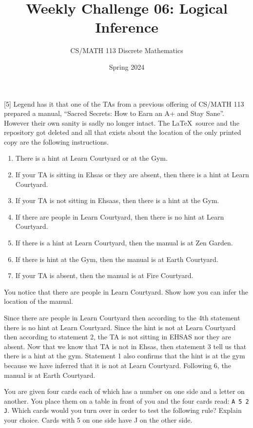 \documentclass[a4paper]{exam}
\title{Weekly Challenge 06: Logical Inference}
\author{CS/MATH 113 Discrete Mathematics}
\date{Spring 2024}
\begin{document}
\maketitle

\begin{questions}

  [5] Legend has it that one of the TAs from a previous offering of CS/MATH 113 prepared a manual, ``Sacred Secrets: How to Earn an A+ and Stay Sane''. However their own sanity is sadly no longer intact. The \LaTeX\ source and the repository got deleted and all that exists about the location of the only printed copy are the following instructions.
  \begin{enumerate}
  \item There is a hint at Learn Courtyard or at the Gym.
  \item If your TA is sitting in Ehsas or they are absent, then there is a hint at Learn Courtyard.
  \item If your TA is not sitting in Ehsaas, then there is a hint at the Gym.
  \item If there are people in Learn Courtyard, then there is no hint at Learn Courtyard.
  \item If there is a hint at Learn Courtyard, then the manual is at Zen Garden.
  \item If there is hint at the Gym, then the manual is at Earth Courtyard.
  \item If your TA is absent, then the manual is at Fire Courtyard.
  \end{enumerate}
  You notice that there are people in Learn Courtyard. Show how you can infer the location of the manual.

  \begin{solution}
    
    Since there are people in Learn Courtyard then according to the 4th statement there is no hint at Learn Courtyard. Since the hint is not at Learn Courtyard then according to statement 2, the TA is not sitting in EHSAS nor they are absent. Now that we know that TA is not in Ehsas, then statement 3 tell us that there is a hint at the gym. Statement 1 also confirms that the hint is at the gym because we have inferred that it is not at Learn Courtyard. Following 6, the manual is at Earth Courtyard.
    
  \end{solution}

 You are given four cards each of which has a number on one side and a letter on another. You place them on a table in front of you and the four cards read: \texttt{A 5 2 J}. Which cards would you turn over in order to test the following rule? Explain your choice.
      {\quotation Cards with 5 on one side have J on the other side.}


\end{questions}
\end{document}
